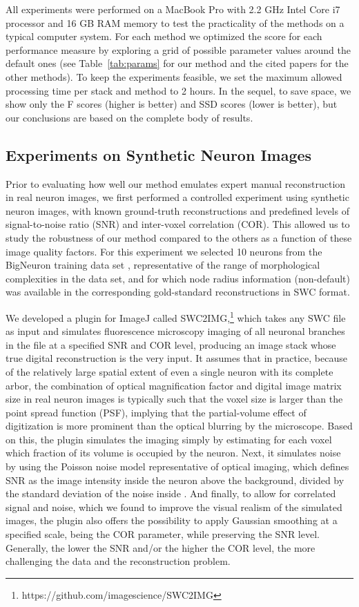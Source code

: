 All experiments were performed on a MacBook Pro with 2.2 GHz Intel Core i7 processor and 16 GB RAM memory to test the practicality of the methods on a typical computer system. For each method we optimized the score for each performance measure by exploring a grid of possible parameter values around the default ones (see Table~\ref{tab:params} for our method and the cited papers for the other methods). To keep the experiments feasible, we set the maximum allowed processing time per stack and method to 2 hours. In the sequel, to save space, we show only the F scores (higher is better) and SSD scores (lower is better), but our conclusions are based on the complete body of results.

\subsection{Experiments on Synthetic Neuron Images}
\label{subsec:eval-sim}
Prior to evaluating how well our method emulates expert manual reconstruction in real neuron images, we first performed a controlled experiment using synthetic neuron images, with known ground-truth reconstructions and predefined levels of signal-to-noise ratio (SNR) and inter-voxel correlation (COR). This allowed us to study the robustness of our method compared to the others as a function of these image quality factors. For this experiment we selected 10 neurons from the BigNeuron training data set \citep{peng2015bigneuron}, representative of the range of morphological complexities in the data set, and for which node radius information (non-default) was available in the corresponding gold-standard reconstructions in SWC format.

We developed a plugin for ImageJ \citep{schneider2012} called SWC2IMG,\footnote{https://github.com/imagescience/SWC2IMG} which takes any SWC file as input and simulates fluorescence microscopy imaging of all neuronal branches in the file at a specified SNR and COR level, producing an image stack whose true digital reconstruction is the very input. It assumes that in practice, because of the relatively large spatial extent of even a single neuron with its complete arbor, the combination of optical magnification factor and digital image matrix size in real neuron images is typically such that the voxel size is larger than the point spread function (PSF), implying that the partial-volume effect of digitization is more prominent than the optical blurring by the microscope. Based on this, the plugin simulates the imaging simply by estimating for each voxel which fraction of its volume is occupied by the neuron. Next, it simulates noise by using the Poisson noise model representative of optical imaging, which defines SNR as the image intensity inside the neuron above the background, divided by the standard deviation of the noise inside \citep{sheppard2006}. And finally, to allow for correlated signal and noise, which we found to improve the visual realism of the simulated images, the plugin also offers the possibility to apply Gaussian smoothing at a specified scale, being the COR parameter, while preserving the SNR level. Generally, the lower the SNR and/or the higher the COR level, the more challenging the data and the reconstruction problem.

